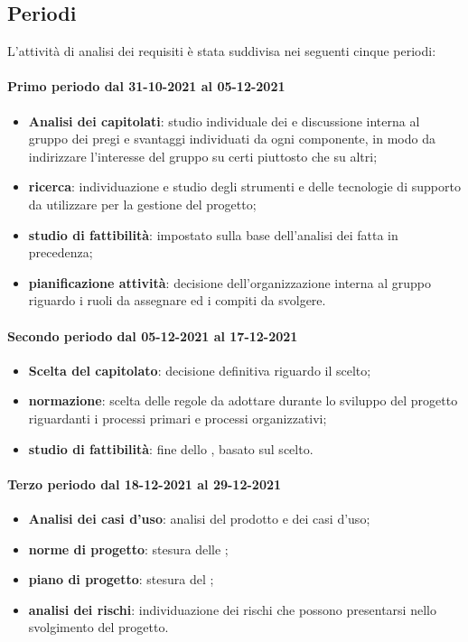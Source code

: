 \subsection{Periodi} 
L'attività di analisi dei requisiti è stata suddivisa nei seguenti cinque periodi: 

\paragraph{Primo periodo dal 31-10-2021 al 05-12-2021} 
\begin{itemize} 
	\item \textbf{Analisi dei capitolati}: studio individuale dei  e discussione interna al gruppo dei pregi e svantaggi individuati da ogni componente, in modo da indirizzare l’interesse del gruppo su certi  piuttosto che su altri; 
	\item \textbf{ricerca}: individuazione e studio degli strumenti e delle tecnologie di supporto da utilizzare per la gestione del progetto; 
	\item \textbf{studio di fattibilità}: impostato sulla base dell'analisi dei  fatta in precedenza; 
	\item \textbf{pianificazione attività}: decisione dell'organizzazione interna al gruppo riguardo i ruoli da assegnare ed i compiti da svolgere. 
\end{itemize} 

\paragraph{Secondo periodo dal 05-12-2021 al 17-12-2021} 
\begin{itemize} 
	\item \textbf{Scelta del capitolato}: decisione definitiva riguardo il  scelto; 
	\item \textbf{normazione}: scelta delle regole da adottare durante lo sviluppo del progetto riguardanti i 
	processi primari e processi organizzativi; 
	\item \textbf{studio di fattibilità}: fine dello , basato sul  scelto. 
\end{itemize} 

\paragraph{Terzo periodo dal 18-12-2021 al 29-12-2021} 
\begin{itemize} 
	\item \textbf{Analisi dei casi d'uso}: analisi del prodotto e dei casi d’uso; 
	\item \textbf{norme di progetto}: stesura delle ; 
	\item \textbf{piano di progetto}: stesura del ; 
	\item \textbf{analisi dei rischi}: individuazione dei rischi che possono presentarsi nello svolgimento del progetto. 
\end{itemize} 

